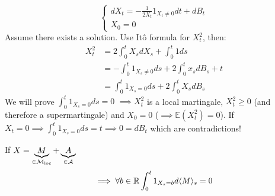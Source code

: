 \begin{example}[No solutions]
    \begin{equation}
        \begin{cases}
            dX_t=-\frac{1}{2X_t}1_{X_t\neq 0}dt+dB_t\\
            X_0=0
        \end{cases}        
    \end{equation}
    Assume there exists a solution. Use Itô formula for $X_t^2$, then:
    \begin{align*}
        X_t^2&=2\int_0^t X_s dX_s +\int_0^t 1 ds\\
        &=-\int_0^t 1_{X_s\neq 0}ds +2\int_0^t x_s dB_s+t\\
        &=\int_0^t 1_{X_s=0}ds+2\int_0^t X_s dB_s
    \end{align*}
    We will prove $\int_0^t 1_{X_s=0}ds=0$ $\implies X_t^2$ is a local martingale, $X_t^2\geq 0$ (and therefore a supermartingale) and $X_0=0$ ($\implies \mathbb{E}(X_t^2)=0$). 
    If $X_t=0\implies \int_0^t 1_{X_s=0}ds=t\implies 0=dB_t$ which are contradictions!
\end{example}

\begin{remark}
    If $X=\underbrace{M}_{\in\mathcal{M}_{\text{loc}}}+\underbrace{A}_{\in\mathcal{A}}$
    \[\implies \forall b\in \mathbb{R}\int_0^t 1_{X_s=b}d \langle M\rangle_s=0\]
\end{remark}








